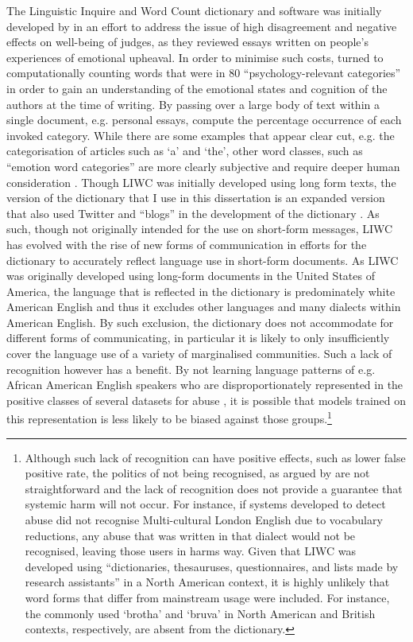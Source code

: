 The Linguistic Inquire and Word Count dictionary and software was initially developed by \citet{Pennebaker:2001} in an effort to address the issue of high disagreement and negative effects on well-being of judges, as they reviewed essays written on people's experiences of emotional upheaval. In order to minimise such costs, \citet{Pennebaker:2001} turned to computationally counting words that were in $80$ ``psychology-relevant categories'' in order to gain an understanding of the emotional states and cognition of the authors at the time of writing. By passing over a large body of text within a single document, e.g. personal essays, \citet{Pennebaker:2001} compute the percentage occurrence of each invoked category. While there are some examples that appear clear cut, e.g. the categorisation of articles such as `a' and `the',
other word classes, such as ``emotion word categories'' are more clearly subjective and require deeper human consideration \citep{Tauscik:2010}.
Though LIWC was initially developed using long form texts, the version of the dictionary that I use in this dissertation is an expanded version that also used Twitter and ``blogs'' in the development of the dictionary \citep{Pennebaker:2015}. As such, though not originally intended for the use on short-form messages, LIWC has evolved with the rise of new forms of communication in efforts for the dictionary to accurately reflect language use in short-form documents.
As LIWC was originally developed using long-form documents in the United States of America, the language that is reflected in the dictionary is predominately white American English and thus it excludes other languages and many dialects within American English. By such exclusion, the dictionary does not accommodate for different forms of communicating, in particular it is likely to only insufficiently cover the language use of a variety of marginalised communities. Such a lack of recognition however has a benefit. By not learning language patterns of e.g. African American English speakers who are disproportionately represented in the positive classes of several datasets for abuse \citep{Waseem:2018,Davidson:2019}, it is possible that models trained on this representation is less likely to be biased against those groups.\footnote{Although such lack of recognition can have positive effects, such as lower false positive rate, the politics of not being recognised, as argued by \citet{Benjamin:2019} are not straightforward and the lack of recognition does not provide a guarantee that systemic harm will not occur. For instance, if systems developed to detect abuse did not recognise Multi-cultural London English due to vocabulary reductions, any abuse that was written in that dialect would not be recognised, leaving those users in harms way. Given that LIWC was developed using ``dictionaries, thesauruses, questionnaires, and lists made by research assistants'' \citep{Tauscik:2010} in a North American context, it is highly unlikely that word forms that differ from mainstream usage were included. For instance, the commonly used `brotha' and `bruva' in North American and British contexts, respectively, are absent from the dictionary.}
\vspace{5mm}

